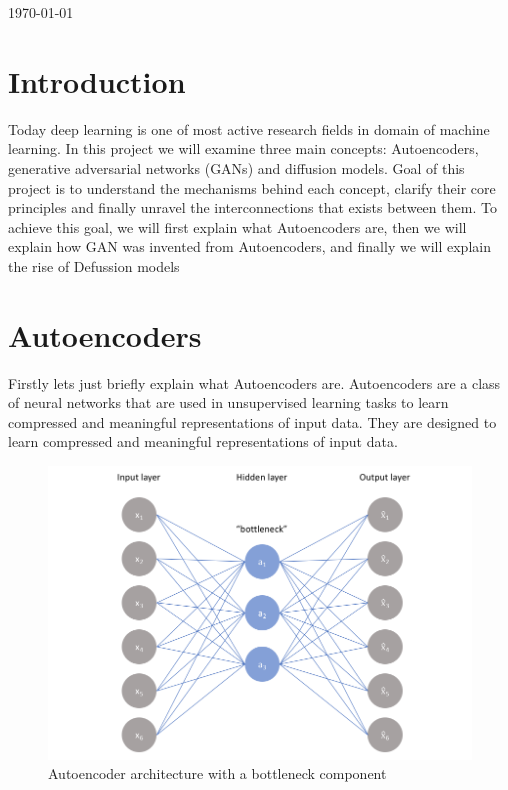 \documentclass{article}
\begin{document}
\begin{titlepage}
{\large \today}\\[2cm] %



\vfill %
\end{titlepage}
			
	\section{Introduction}
			
	Today deep learning is one of most active research fields in domain of machine learning. In this project we will examine three main concepts: Autoencoders, generative adversarial networks (GANs) and diffusion models. Goal of this project is to understand the mechanisms behind each concept, clarify their core principles and finally unravel the interconnections that exists between them. 
	To achieve this goal, we will first explain what Autoencoders are, then we will explain how GAN was invented from Autoencoders, and finally we will explain the rise of Defussion models
	
	\section{Autoencoders}

	Firstly lets just briefly explain what Autoencoders are.
	Autoencoders are a class of neural networks that are used in unsupervised learning tasks to learn compressed and meaningful representations of input data.
	They are designed to learn compressed and meaningful representations of input data.

	\begin{figure}[h]
		\centering
		\includegraphics[width=0.5\linewidth]{images/bottleneck.png}
		\caption{Autoencoder architecture with a bottleneck component}
		\label{fig:bottleneck}
	\end{figure}
\end{document}
